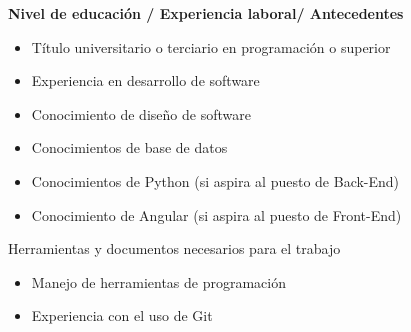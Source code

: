 \begin{itemize}
\begin{itemize}
                \end{itemize}
			{\correccionTexto                
            \item \textbf{Nivel de educación / Experiencia laboral/ Antecedentes}
                \begin{itemize}
                    \item Título universitario o terciario en programación o superior
                    \item Experiencia en desarrollo de software
                    \item Conocimiento de diseño de software
                    \item Conocimientos de base de datos
                    \item Conocimientos de Python (si aspira al puesto de Back-End)
                    \item Conocimiento de Angular (si aspira al puesto de Front-End)
                \end{itemize}
            \item Herramientas y documentos necesarios para el trabajo
            	\begin{itemize}
                    \item Manejo de herramientas de programación
                    \item Experiencia con el uso de Git
                \end{itemize}
			}                
		\end{itemize}
  
